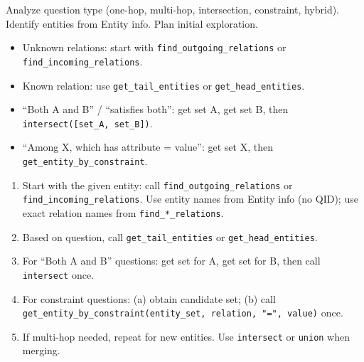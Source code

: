 \begin{table}[t!]
\begin{minipage}{\textwidth}
\begin{mdframed}[style=outerframe]
\begin{mdframed}[style=subframe]
\vspace{2pt}
{\small Analyze question type (one-hop, multi-hop, intersection, constraint, hybrid). Identify entities from Entity info. Plan initial exploration.}
 
\vspace{4pt}
\begin{itemize}[leftmargin=*, labelindent=0pt, labelsep=0.6em, itemsep=1pt, topsep=2pt]
  \small
  \item Unknown relations: start with \texttt{find\_outgoing\_relations} or \texttt{find\_incoming\_relations}.
  \item Known relation: use \texttt{get\_tail\_entities} or \texttt{get\_head\_entities}.
  \item ``Both A and B'' / ``satisfies both'': get set A, get set B, then \texttt{intersect([set\_A, set\_B])}.
  \item ``Among X, which has attribute = value'': get set X, then \texttt{get\_entity\_by\_constraint}.
\end{itemize}
 
\vspace{4pt}
\begin{enumerate}[leftmargin=2em, itemsep=1pt, topsep=2pt, label=\arabic*.]
  \small
  \item Start with the given entity: call \texttt{find\_outgoing\_relations} or \texttt{find\_incoming\_relations}. Use entity names from Entity info (no QID); use exact relation names from \texttt{find\_*\_relations}.
  \item Based on question, call \texttt{get\_tail\_entities} or \texttt{get\_head\_entities}.
  \item For ``Both A and B'' questions: get set for A, get set for B, then call \texttt{intersect} once.
  \item For constraint questions: (a) obtain candidate set; (b) call \texttt{get\_entity\_by\_constraint(entity\_set, relation, "=", value)} once.
  \item If multi-hop needed, repeat for new entities. Use \texttt{intersect} or \texttt{union} when merging.
\end{enumerate}
 

\end{mdframed}
\end{mdframed}
\end{minipage}
\end{table}

